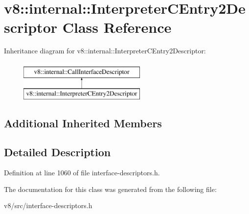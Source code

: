 \hypertarget{classv8_1_1internal_1_1InterpreterCEntry2Descriptor}{}\section{v8\+:\+:internal\+:\+:Interpreter\+C\+Entry2\+Descriptor Class Reference}
\label{classv8_1_1internal_1_1InterpreterCEntry2Descriptor}
Inheritance diagram for v8\+:\+:internal\+:\+:Interpreter\+C\+Entry2\+Descriptor\+:\begin{figure}[H]
\begin{center}
\leavevmode
\includegraphics[height=2.000000cm]{classv8_1_1internal_1_1InterpreterCEntry2Descriptor}
\end{center}
\end{figure}
\subsection*{Additional Inherited Members}


\subsection{Detailed Description}


Definition at line 1060 of file interface-\/descriptors.\+h.



The documentation for this class was generated from the following file\+:\begin{DoxyCompactItemize}
\item 
v8/src/interface-\/descriptors.\+h\end{DoxyCompactItemize}

